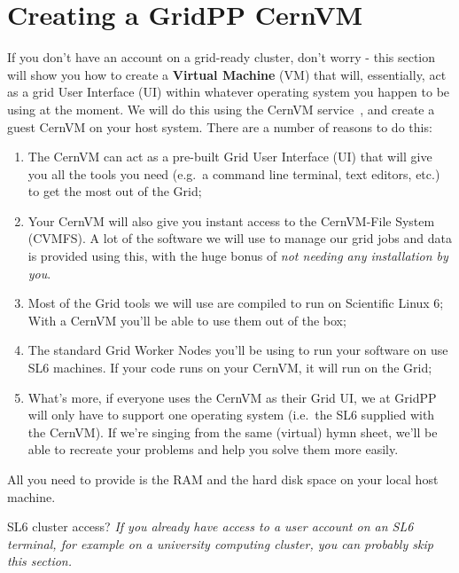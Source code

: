 \section{Creating a GridPP CernVM}
\label{sec:gridppcernvm}
If you don't have an account on a grid-ready cluster, don't worry - this
section will show you how to create a \textbf{Virtual Machine} (VM) that
will, essentially, act as a grid User Interface (UI) within whatever
operating system you happen to be using at the moment. We will do this
using the CernVM service~\cite{CernVM2015},
and create a guest CernVM on your host system.
There are a number of reasons to do this:

\begin{enumerate}
\def\labelenumi{\arabic{enumi}.}
\tightlist
\item
  The CernVM can act as a pre-built Grid User Interface (UI) that will
  give you all the tools you need (e.g.~a command line terminal, text
  editors, etc.) to get the most out of the Grid;
\item
  Your CernVM will also give you instant access to the CernVM-File
  System (CVMFS). A lot of the software we will use to manage our grid
  jobs and data is provided using this, with the huge bonus of \emph{not
  needing any installation by you}.
\item
  Most of the Grid tools we will use are compiled to run on Scientific
  Linux 6; With a CernVM you'll be able to use them out of the box;
\item
  The standard Grid Worker Nodes you'll be using to run your software on
  use SL6 machines. If your code runs on your CernVM, it will run on the
  Grid;
\item
  What's more, if everyone uses the CernVM as their Grid UI, we at
  GridPP will only have to support one operating system (i.e.~the SL6
  supplied with the CernVM). If we're singing from the same (virtual)
  hymn sheet, we'll be able to recreate your problems and help you solve
  them more easily.
\end{enumerate}

All you need to provide is the RAM and the hard disk space on your local
host machine.

\begin{infobox}{SL6 cluster access?}
\emph{If you already have access to a user account on an SL6 terminal, for
example on a university computing cluster, you can probably skip this
section.}
\end{infobox}

